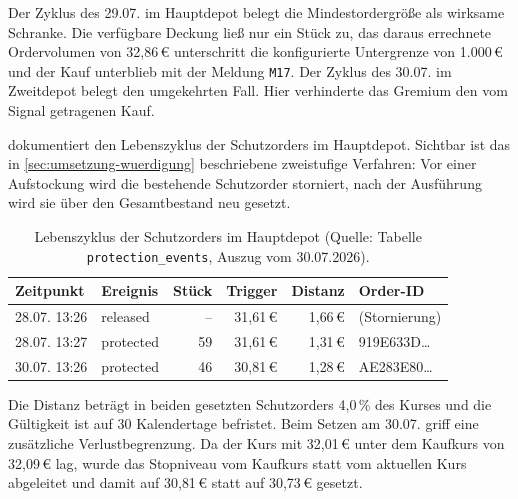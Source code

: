 Der Zyklus des 29.07. im Hauptdepot belegt die Mindestordergröße als wirksame
Schranke. Die verfügbare Deckung ließ nur ein Stück zu, das daraus errechnete
Ordervolumen von 32{,}86\,€ unterschritt die konfigurierte Untergrenze von
1.000\,€ und der Kauf unterblieb mit der Meldung \texttt{M17}. Der Zyklus des
30.07. im Zweitdepot belegt den umgekehrten Fall. Hier verhinderte das Gremium
den vom Signal getragenen Kauf.

 dokumentiert den Lebenszyklus der
Schutzorders im Hauptdepot. Sichtbar ist das in
\cref{sec:umsetzung-wuerdigung} beschriebene zweistufige Verfahren: Vor einer
Aufstockung wird die bestehende Schutzorder storniert, nach der Ausführung wird
sie über den Gesamtbestand neu gesetzt.

\begin{table}[htbp]
  \centering
  \footnotesize
  \caption[Lebenszyklus der Schutzorders im Hauptdepot]{%
    Lebenszyklus der Schutzorders im Hauptdepot (Quelle: Tabelle
    \texttt{protection\_events}, Auszug vom 30.07.2026).\quelleeigen}
  \label{tab:anhang-echtgeldwoche-schutz}
  \begin{tabular}{l l r r r l}
    \toprule
    Zeitpunkt & Ereignis & Stück & Trigger & Distanz & Order-ID \\
    \midrule
    28.07. 13:26 & released  & -- & 31{,}61\,€ & 1{,}66\,€ & (Stornierung) \\
    28.07. 13:27 & protected & 59 & 31{,}61\,€ & 1{,}31\,€ & 919E633D\ldots \\
    30.07. 13:26 & protected & 46 & 30{,}81\,€ & 1{,}28\,€ & AE283E80\ldots \\
    \bottomrule
  \end{tabular}
\end{table}

Die Distanz beträgt in beiden gesetzten Schutzorders 4{,}0\,\% des Kurses und die
Gültigkeit ist auf 30 Kalendertage befristet. Beim Setzen am 30.07. griff eine
zusätzliche Verlustbegrenzung. Da der Kurs mit
32{,}01\,€ unter dem Kaufkurs von 32{,}09\,€ lag, wurde das Stopniveau vom
Kaufkurs statt vom aktuellen Kurs abgeleitet und damit auf 30{,}81\,€ statt auf
30{,}73\,€ gesetzt.
